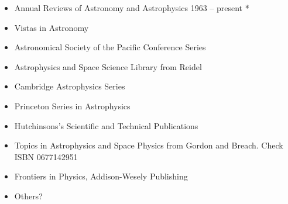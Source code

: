 \begin{itemize}
  \item Annual Reviews of Astronomy and Astrophysics 1963 -- present *
  \item Vistas in Astronomy
  \item Astronomical Society of the Pacific Conference Series
  \item Astrophysics and Space Science Library from Reidel
  \item Cambridge Astrophysics Series
  \item Princeton Series in Astrophysics
  \item Hutchinsons's Scientific and Technical Publications
  \item Topics in Astrophysics and Space Physics from Gordon and Breach. Check ISBN 0677142951
  \item Frontiers in Physics, Addison-Wesely Publishing    
  \item Others?
\end{itemize}

